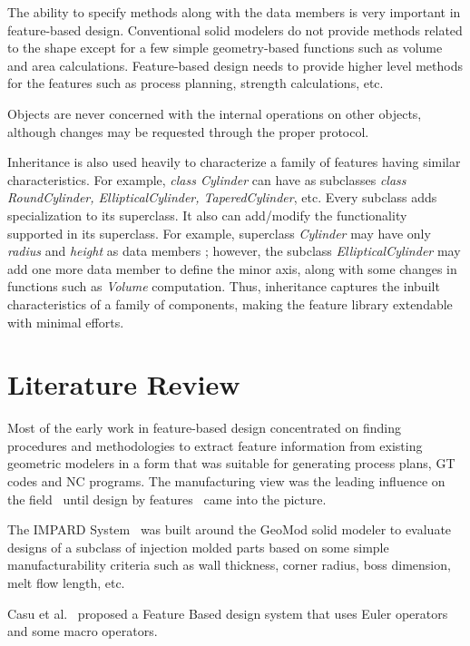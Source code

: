 	The ability to specify methods along with the data members is very important
	in feature-based design. Conventional solid modelers
	do not provide methods related to the shape except for a few simple 
	geometry-based functions such as volume and area calculations. 
	Feature-based design
	needs to provide higher level methods for the features such as process
	planning, strength calculations, etc.

	Objects are never concerned with the
    internal operations on other objects, although changes may be requested
    through the proper protocol. 

	Inheritance is also used heavily to characterize a family of features
	having similar characteristics. For example, {\em class Cylinder} can
	have as subclasses {\em class RoundCylinder, EllipticalCylinder,
	TaperedCylinder}, etc. Every subclass adds specialization to its superclass.
	It also can add/modify the functionality supported in its superclass.
	For example, superclass {\em Cylinder} may have only {\em radius} and 
	{\em height} as data members ; however, the subclass {\em 
	EllipticalCylinder}
	may add one more data member to define the minor axis, along with
	some changes in functions such as {\em Volume} computation. Thus,
	inheritance captures the inbuilt characteristics of a family of components,
	making the feature library extendable with minimal efforts.


	\section{Literature Review}

    Most of the early work in feature-based design concentrated on 
	finding procedures and 
	methodologies to extract feature information from existing 
	geometric modelers in a form that was suitable for generating process 
	plans, GT 
	codes and NC programs. The manufacturing view was the leading influence on 
	the field~\cite{Gray} until design by features~\cite{Dixon} came into 
	the picture.


    The IMPARD System~\cite{Vaghul} was built around the GeoMod solid 
	modeler to evaluate designs of a subclass of injection molded parts based on
	some simple manufacturability criteria such as wall thickness, corner 
	radius, boss dimension, melt flow length, etc.
 
        Casu et al.~\cite{Casu} proposed a Feature Based design system that
		uses Euler operators and some macro operators.


